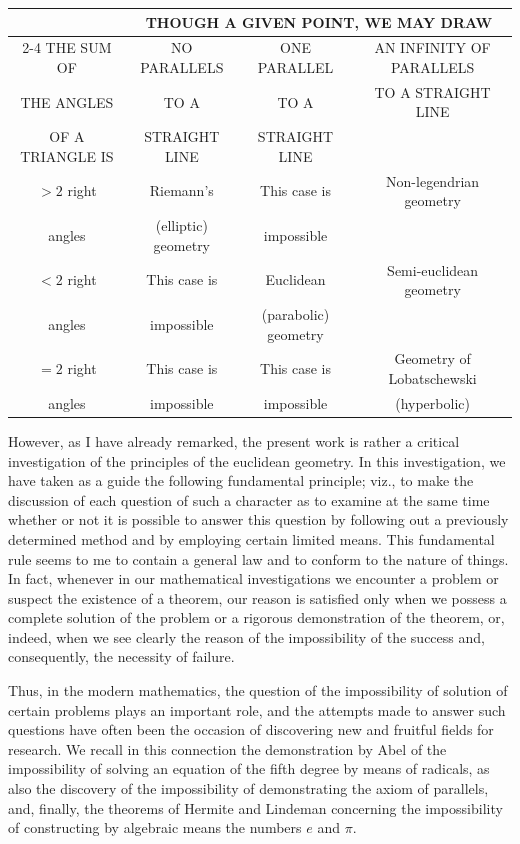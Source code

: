 \documentclass[11pt,oneside]{book}
\begin{document}
\begin{tabular}{c|c|c|c}
\hline
\hline
&\multicolumn{3}{c}{{\tiny THOUGH A GIVEN POINT, WE MAY DRAW}} \\
\cline{2-4}
{\tiny THE SUM OF}&{\tiny NO PARALLELS}&{\tiny ONE PARALLEL}&{\tiny AN INFINITY OF PARALLELS}\\[-1ex]
{\tiny THE ANGLES}&{\tiny TO A}&{\tiny TO A}&{\tiny TO A STRAIGHT LINE}\\[-1ex]
{\tiny OF A TRIANGLE IS}&{\tiny STRAIGHT LINE}&{\tiny STRAIGHT LINE}&\\
\hline
{\tiny $>2$ right}&{\tiny Riemann's}&{\tiny This case is}&{\tiny Non-legendrian geometry}\\[-1ex]
{\tiny angles}&{\tiny (elliptic) geometry}&{\tiny impossible}& \\
\hline
{\tiny $<2$ right}&{\tiny This case is}&{\tiny Euclidean}&{\tiny Semi-euclidean geometry}\\[-1ex]
{\tiny angles}&{\tiny impossible}&{\tiny (parabolic) geometry} & \\
\hline
{\tiny $= 2$ right}&{\tiny This case is}&{\tiny This case is}&{\tiny Geometry of Lobatschewski}\\[-1ex]
{\tiny angles}&{\tiny impossible}&{\tiny impossible}&{\tiny(hyperbolic)}\\
\hline
\hline
\end{tabular}

\vspace*{4mm}
However, as I have already remarked, the present
work is rather a critical investigation of the principles
of the euclidean geometry. In this investigation, we
have taken as a guide the following fundamental principle;
viz., to make the discussion of each question
of such a character as to examine at the same time
whether or not it is possible to answer this question
by following out a previously determined method and
by employing certain limited means. This fundamental
rule seems to me to contain a general law and to
conform to the nature of things. In fact, whenever
in our mathematical investigations we encounter a
problem or suspect the existence of a theorem, our
reason is satisfied only when we possess a complete
solution of the problem or a rigorous demonstration of
the theorem, or, indeed, when we see clearly the reason
of the impossibility of the success and, consequently,
the necessity of failure.

Thus, in the modern mathematics, the question of
the impossibility of solution of certain problems plays
an important role, and the attempts made to answer
such questions have often been the occasion of discovering
new and fruitful fields for research. We recall
in this connection the demonstration by Abel of
the impossibility of solving an equation of the fifth
degree by means of radicals, as also the discovery of
the impossibility of demonstrating the axiom of parallels,
and, finally, the theorems of Hermite and Lindeman
concerning the impossibility of constructing
by algebraic means the numbers $e$ and $\pi$.
\end{document}
